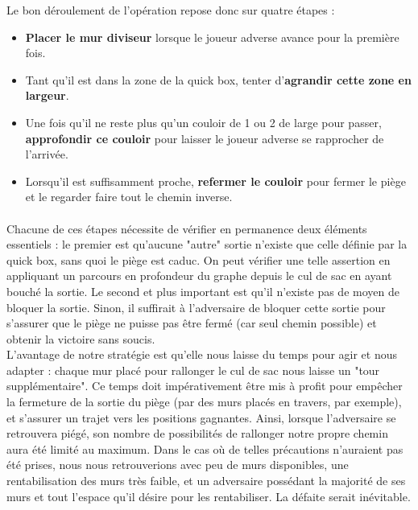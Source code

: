 \documentclass[a4paper]{article}
\begin{document}
Le bon déroulement de l'opération repose donc sur quatre étapes :

\begin{itemize}
    \item \textbf{Placer le mur diviseur} lorsque le joueur adverse avance pour la première fois.
    \item Tant qu'il est dans la zone de la quick box, tenter d'\textbf{agrandir cette zone en largeur}.
    \item Une fois qu'il ne reste plus qu'un couloir de 1 ou 2 de large pour passer, \textbf{approfondir ce couloir} pour laisser le joueur adverse se rapprocher de l'arrivée.
    \item Lorsqu'il est suffisamment proche, \textbf{refermer le couloir} pour fermer le piège et le regarder faire tout le chemin inverse.
\end{itemize}

\paragraph{}
Chacune de ces étapes nécessite de vérifier en permanence deux éléments essentiels : le premier est qu'aucune "autre" sortie n'existe que celle définie par la quick box, sans quoi le piège est caduc. On peut vérifier une telle assertion en appliquant un parcours en profondeur du graphe depuis le cul de sac en ayant bouché la sortie. Le second et plus important est qu'il n'existe pas de moyen de bloquer la sortie. Sinon, il suffirait à l'adversaire de bloquer cette sortie pour s'assurer que le piège ne puisse pas être fermé (car seul chemin possible) et obtenir la victoire sans soucis. \\

L'avantage de notre stratégie est qu'elle nous laisse du temps pour agir et nous adapter : chaque mur placé pour rallonger le cul de sac nous laisse un "tour supplémentaire". Ce temps doit impérativement être mis à profit pour empêcher la fermeture de la sortie du piège (par des murs placés en travers, par exemple), et s'assurer un trajet vers les positions gagnantes. Ainsi, lorsque l'adversaire se retrouvera piégé, son nombre de possibilités de rallonger notre propre chemin aura été limité au maximum. Dans le cas où de telles précautions n'auraient pas été prises, nous nous retrouverions avec peu de murs disponibles, une rentabilisation des murs très faible, et un adversaire possédant la majorité de ses murs et tout l'espace qu'il désire pour les rentabiliser. La défaite serait inévitable. \\
\end{document}
